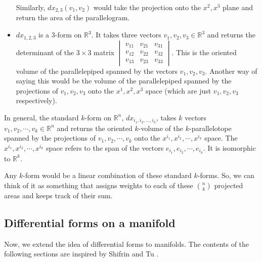\documentclass{article}
\theoremstyle{definition}
\theoremstyle{named}
\begin{document}
\begin{itemize}
\begin{center}
\end{center}
    Similarly,  $dx_{2,3}(v_1, v_2)$ would take the projection onto the $x^2, x^3$ plane and return the area of the parallelogram. 
    \item $dx_{1,2,3}$ is a 3-form on $\mathbb{R}^3$. It takes three vectors $v_1, v_2, v_3 \in \mathbb{R}^3$ and returns the determinant of the $3\times3$ matrix
    \(
        \begin{vmatrix}        
            v_{11} & v_{21} & v_{31}\\
            v_{12} & v_{22} & v_{32}\\
            v_{13} & v_{23} & v_{33}
        \end{vmatrix}
    \). This is the oriented volume of the parallelepiped spanned by the vectors $v_1, v_2, v_3$. Another way of saying this would be the volume of the parallelepiped spanned by the projections of $v_1, v_2, v_3$ onto the $x^1, x^2, x^3$ space (which are just $v_1, v_2, v_3$ respectively).
\end{itemize}
In general, the standard  $k$-form on $\mathbb{R}^n$, $dx_{i_1, i_2, \ldots, i_k}$, takes $k$ vectors $v_1, v_2, \cdots, v_k \in \mathbb{R}^n$ and returns the oriented $k$-volume of the  $k$-parallelotope spanned by the projections of $v_1, v_2, \cdots, v_k$ onto the $x^{i_1}, x^{i_2}, \cdots, x^{i_k}$ space. The $x^{i_1}, x^{i_2}, \cdots, x^{i_k}$ space refers to the span of the vectors $e_{i_1}, e_{i_2}, \cdots, e_{i_k}$. It is isomorphic to $\mathbb{R}^k$.

Any $k$-form would be a linear combination of these standard  $k$-forms. So, we can think of it as something that assigns weights to each of these $\binom{n}{k}$ projected areas and keeps track of their sum.
\subsection{Differential forms on a manifold}
Now, we extend the idea of differential forms to manifolds. The contents of the following sections are inspired by Shifrin \cite{shifrin2004multivariable} and Tu \cite{tu2010introduction}.
\end{document}
